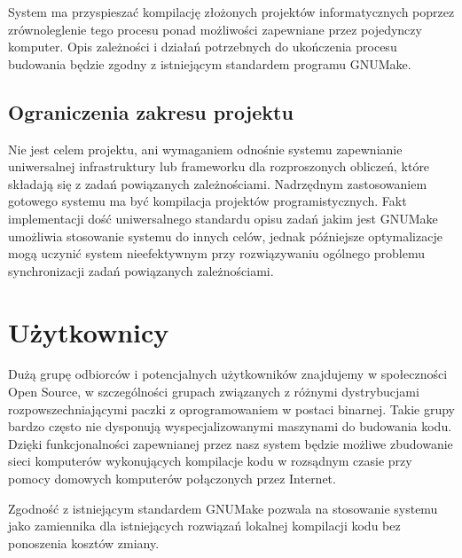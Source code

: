 \documentclass[a4paper]{article}
\begin{document}
System ma przyspieszać kompilację złożonych projektów informatycznych poprzez zrównoleglenie tego procesu ponad możliwości zapewniane przez pojedynczy komputer. Opis zależności i działań potrzebnych do ukończenia procesu budowania będzie zgodny z istniejącym standardem programu GNUMake.

\subsection{Ograniczenia zakresu projektu}

Nie jest celem projektu, ani wymaganiem odnośnie systemu zapewnianie uniwersalnej infrastruktury lub frameworku dla rozproszonych obliczeń, które składają się z zadań powiązanych zależnościami. Nadrzędnym zastosowaniem gotowego systemu ma być kompilacja projektów programistycznych. Fakt implementacji dość uniwersalnego standardu opisu zadań jakim jest GNUMake umożliwia stosowanie systemu do innych celów, jednak późniejsze optymalizacje mogą uczynić system nieefektywnym przy rozwiązywaniu ogólnego problemu synchronizacji zadań powiązanych zależnościami.

\section{Użytkownicy}

Dużą grupę odbiorców i potencjalnych użytkowników znajdujemy w społeczności Open Source, w szczególności grupach związanych z różnymi dystrybucjami rozpowszechniającymi paczki z oprogramowaniem w postaci binarnej. Takie grupy bardzo często nie dysponują wyspecjalizowanymi maszynami do budowania kodu. Dzięki funkcjonalności zapewnianej przez nasz system będzie możliwe zbudowanie sieci komputerów wykonujących kompilacje kodu w rozsądnym czasie przy pomocy domowych komputerów połączonych przez Internet.

Zgodność z istniejącym standardem GNUMake pozwala na stosowanie systemu jako zamiennika dla istniejących rozwiązań lokalnej kompilacji kodu bez ponoszenia kosztów zmiany.
\end{document}

